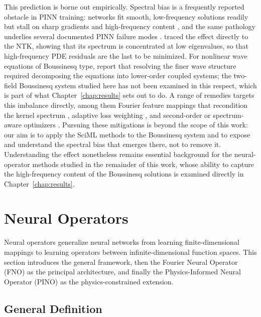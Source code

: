 This prediction is borne out empirically. Spectral bias is a frequently reported obstacle in PINN training: networks fit smooth, low-frequency solutions readily but stall on sharp gradients and high-frequency content \parencite{rahaman2019, xu2019frequency, wang2021understanding}, and the same pathology underlies several documented PINN failure modes \parencite{krishnapriyan2021characterizing}. \textcite{wang2022ntk} traced the effect directly to the NTK, showing that its spectrum is concentrated at low eigenvalues, so that high-frequency PDE residuals are the last to be minimized. For nonlinear wave equations of Boussinesq type, \textcite{wang2024} report that resolving the finer wave structure required decomposing the equations into lower-order coupled systems; the two-field Boussinesq system studied here has not been examined in this respect, which is part of what Chapter~\ref{chap:results} sets out to do. A range of remedies targets this imbalance directly, among them Fourier feature mappings that recondition the kernel spectrum \parencite{tancik2020}, adaptive loss weighting \parencite{wang2021understanding}, and second-order or spectrum-aware optimizers \parencite{khodakarami2026}. Pursuing these mitigations is beyond the scope of this work: our aim is to apply the SciML methods to the Boussinesq system and to expose and understand the spectral bias that emerges there, not to remove it. Understanding the effect nonetheless remains essential background for the neural-operator methods studied in the remainder of this work, whose ability to capture the high-frequency content of the Boussinesq solutions is examined directly in Chapter~\ref{chap:results}.

\section{Neural Operators}
\label{sec:neural_operators}

Neural operators generalize neural networks from learning finite-dimensional mappings to learning operators between infinite-dimensional function spaces. This section introduces the general framework, then the Fourier Neural Operator (FNO) as the principal architecture, and finally the Physics-Informed Neural Operator (PINO) as the physics-constrained extension.

\subsection{General Definition}
\label{subsec:no_general}

